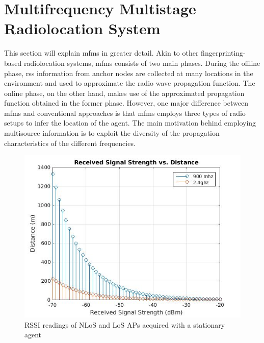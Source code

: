 \section{Multifrequency Multistage Radiolocation System}
\label{sec:mfms}
    This section will explain \gls{mfms} in greater detail.
    Akin to other fingerprinting-based radiolocation systems, \gls{mfms} consists of two main phases.
    During the offline phase, \gls{rss} information from anchor nodes are collected at many locations in the environment and used to approximate the radio wave propagation function.
    The online phase, on the other hand, makes use of the approximated propagation function obtained in the former phase.
    However, one major difference between \gls{mfms} and conventional approaches is that \gls{mfms} employs three types of radio setups to infer the location of the agent.
    The main motivation behind employing multisource information is to exploit the diversity of the propagation characteristics of the different frequencies.

    \begin{figure}[thpb]
       \centering
       \includegraphics[width=\linewidth]{figures/rss-vs-distance.jpg}
       \caption{\label{fig:log-distance}RSSI readings of NLoS and LoS APs acquired with a stationary agent}
    \end{figure}

